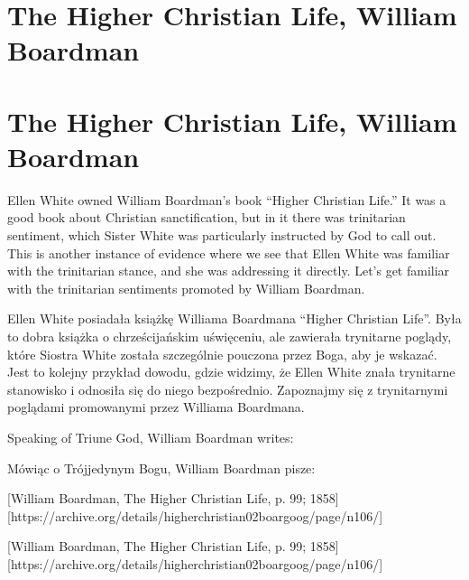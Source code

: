 \section*{The Higher Christian Life, William Boardman}


\section*{The Higher Christian Life, William Boardman}


Ellen White owned William Boardman's book “Higher Christian Life.” It was a good book about Christian sanctification, but in it there was trinitarian sentiment, which Sister White was particularly instructed by God to call out. This is another instance of evidence where we see that Ellen White was familiar with the trinitarian stance, and she was addressing it directly. Let's get familiar with the trinitarian sentiments promoted by William Boardman.


Ellen White posiadała książkę Williama Boardmana “Higher Christian Life”. Była to dobra książka o chrześcijańskim uświęceniu, ale zawierała trynitarne poglądy, które Siostra White została szczególnie pouczona przez Boga, aby je wskazać. Jest to kolejny przykład dowodu, gdzie widzimy, że Ellen White znała trynitarne stanowisko i odnosiła się do niego bezpośrednio. Zapoznajmy się z trynitarnymi poglądami promowanymi przez Williama Boardmana.


Speaking of Triune God, William Boardman writes:


Mówiąc o Trójjedynym Bogu, William Boardman pisze:


[William Boardman, The Higher Christian Life, p. 99; 1858][https://archive.org/details/higherchristian02boargoog/page/n106/]


[William Boardman, The Higher Christian Life, p. 99; 1858][https://archive.org/details/higherchristian02boargoog/page/n106/]


